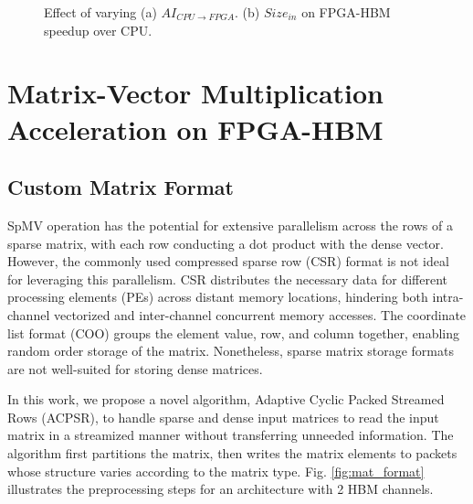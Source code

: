 \documentclass[manuscript,screen,review]{acmart}
\begin{document}
\begin{figure}%
	\centering
	\qquad
	\caption{Effect of varying (a) $AI_{CPU\rightarrow FPGA}$. (b) $Size_{in}$ on FPGA-HBM speedup over CPU.}%
	\label{thresholds}%
\end{figure}

\section{Matrix-Vector Multiplication Acceleration on FPGA-HBM}
\subsection{Custom Matrix Format}

SpMV operation has the potential for extensive parallelism across the rows of a sparse matrix, with each row conducting a dot product with the dense vector. However, the commonly used compressed sparse row (CSR) format is not ideal for leveraging this parallelism. CSR distributes the necessary data for different processing elements (PEs) across distant memory locations, hindering both intra-channel vectorized and inter-channel concurrent memory accesses. The coordinate list format (COO) groups the element value, row, and column together, enabling random order storage of the matrix. Nonetheless, sparse matrix storage formats are not well-suited for storing dense matrices.

In this work, we propose a novel algorithm, Adaptive Cyclic Packed Streamed Rows (ACPSR), to handle sparse and dense input matrices to read the input matrix in a streamized manner without transferring unneeded information. The algorithm first partitions the matrix, then writes the matrix elements to packets whose structure varies according to the matrix type. Fig. \ref{fig:mat_format} illustrates the preprocessing steps for an architecture with 2 HBM channels.
\end{document}
